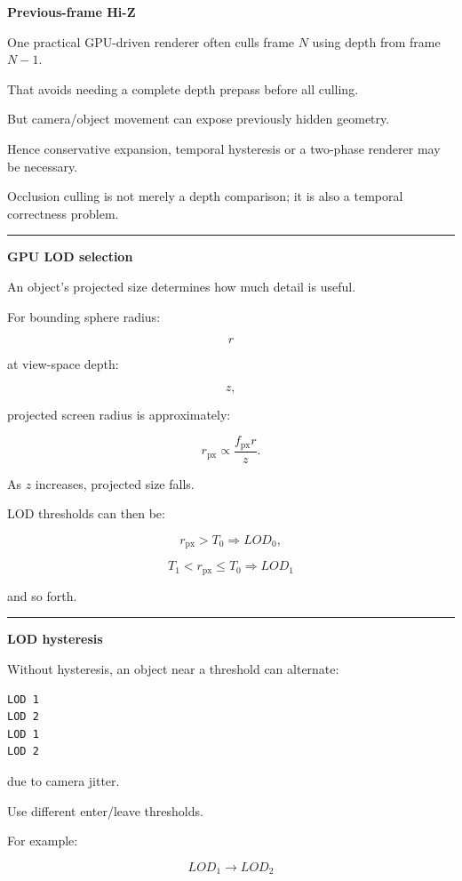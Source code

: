 \textbf{Previous-frame Hi-Z}

One practical GPU-driven renderer often culls frame \(N\) using depth from frame \(N-1\).

That avoids needing a complete depth prepass before all culling.

But camera/object movement can expose previously hidden geometry.

Hence conservative expansion, temporal hysteresis or a two-phase renderer may be necessary.

Occlusion culling is not merely a depth comparison; it is also a temporal correctness problem.

\begin{center}\rule{0.5\linewidth}{0.5pt}\end{center}

\textbf{GPU LOD selection}

An object's projected size determines how much detail is useful.

For bounding sphere radius:

\[
r
\]

at view-space depth:

\[
z,
\]

projected screen radius is approximately:

\[
\boxed{
r_{\text{px}}
\propto
\frac{
f_{\text{px}}r
}{
z
}.
}
\]

As \(z\) increases, projected size falls.

LOD thresholds can then be:

\[
r_{\text{px}}>T_0
\Rightarrow
LOD_0,
\]

\[
T_1<r_{\text{px}}\le T_0
\Rightarrow
LOD_1
\]

and so forth.

\begin{center}\rule{0.5\linewidth}{0.5pt}\end{center}

\textbf{LOD hysteresis}

Without hysteresis, an object near a threshold can alternate:

\protect{}\label{p10-lod-flicker}%
\begin{verbatim}
LOD 1
LOD 2
LOD 1
LOD 2
\end{verbatim}

due to camera jitter.

Use different enter/leave thresholds.

For example:

\[
LOD_1\rightarrow LOD_2
\]

